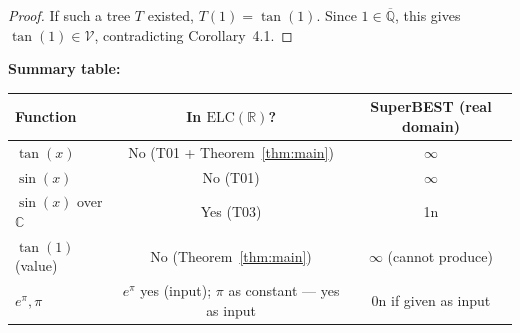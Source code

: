 \documentclass[11pt]{article}
\begin{document}
\begin{proof}
If such a tree $T$ existed, $T(1) = \tan(1)$.
Since $1 \in \overline{\mathbb{Q}}$, this gives $\tan(1) \in \mathcal{V}$,
contradicting Corollary~4.1.
\end{proof}

\noindent \textbf{Summary table:}
\begin{center}
\begin{tabular}{lcc}
\toprule
Function & In $\mathrm{ELC}(\mathbb{R})$? & SuperBEST (real domain) \\
\midrule
$\tan(x)$ & No (T01 + Theorem~\ref{thm:main}) & $\infty$ \\
$\sin(x)$ & No (T01) & $\infty$ \\
$\sin(x)$ over $\mathbb{C}$ & Yes (T03) & 1n \\
$\tan(1)$ (value) & No (Theorem~\ref{thm:main}) & $\infty$ (cannot produce) \\
$e^\pi, \pi$ & $e^\pi$ yes (input); $\pi$ as constant — yes as input & 0n if given as input \\
\bottomrule
\end{tabular}
\end{center}
\end{document}
